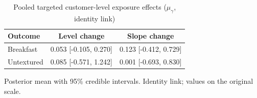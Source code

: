 \begin{table}[H]
\centering
\caption{Pooled targeted customer-level exposure effects ($\mu_\gamma$, identity link)}
\label{tab:a6_mu_gamma}
\begin{tabular}{lcc}
\toprule
Outcome & Level change & Slope change \\
\midrule
Breakfast & 0.053 [-0.105, 0.270] & 0.123 [-0.412, 0.729] \\
Untextured & 0.085 [-0.571, 1.242] & 0.001 [-0.693, 0.830] \\
\bottomrule
\end{tabular}
\par\smallskip\footnotesize Posterior mean with 95\% credible intervals. Identity link; values on the original scale.
\end{table}
